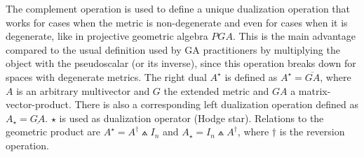 The complement operation is used to define a unique dualization operation that works for
cases when the metric is non-degenerate and even for cases when it is degenerate, like in
projective geometric algebra $PGA$. This is the main advantage compared to the usual
definition used by GA practitioners by multiplying the object with the pseudoscalar (or
its inverse), since this operation breaks down for spaces with degenerate metrics. The
right dual $A^{\star}$ is defined as $A^{\star} = \overline{GA}$, where $A$ is an
arbitrary multivector and $G$ the extended metric and $GA$ a matrix-vector-product. There
is also a corresponding left dualization operation defined as $A_{\star} =
\underline{GA}$. $\star$ is used as dualization operator (Hodge star). Relations to the
geometric product are $A^{\star} = A^{\dagger} \wedgedot I_n$ and $A_{\star} = I_n
\wedgedot A^{\dagger}$, where $\dagger$ is the reversion operation. \\


